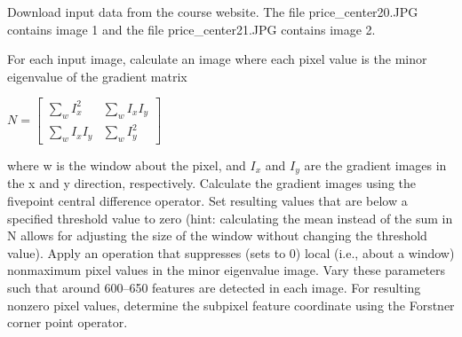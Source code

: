 \documentclass[11pt]{article}
\begin{document}
Download input data from the course website. The file
price\_center20.JPG contains image 1 and the file price\_center21.JPG
contains image 2.

For each input image, calculate an image where each pixel value is the
minor eigenvalue of the gradient matrix

\(N=\left[ \begin{array}{cc} \sum\limits_w I_x^2 & \sum\limits_w I_x I_y\\ \sum\limits_w I_x I_y & \sum\limits_w I_y^2 \end{array} \right]\)

where w is the window about the pixel, and \(I_x\) and \(I_y\) are the
gradient images in the x and y direction, respectively. Calculate the
gradient images using the fivepoint central difference operator. Set
resulting values that are below a specified threshold value to zero
(hint: calculating the mean instead of the sum in N allows for adjusting
the size of the window without changing the threshold value). Apply an
operation that suppresses (sets to 0) local (i.e., about a window)
nonmaximum pixel values in the minor eigenvalue image. Vary these
parameters such that around 600--650 features are detected in each
image. For resulting nonzero pixel values, determine the subpixel
feature coordinate using the Forstner corner point operator.
\end{document}
